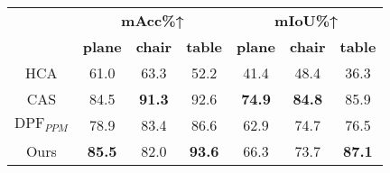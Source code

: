 \newcommand{\graycell}{\cellcolor[HTML]{EFEFEF}}
\newcommand{\redcell}{\cellcolor[HTML]{FAD1D0}}

\begin{tabular}{c|ccc|ccc}
\toprule
\multirow{2}{*}{} & \multicolumn{3}{c}{\textbf{mAcc\%↑}}         & \multicolumn{3}{c}{\textbf{mIoU\%↑}}    \\
                                 & \textbf{plane}  & \textbf{chair} & \textbf{table}     & \textbf{plane}  & \textbf{chair} & \textbf{table}\\
\midrule

HCA               & 61.0  & 63.3 & 52.2  & 41.4  & 48.4 & 36.3  \\
CAS               & 84.5  & \textbf{91.3} & 92.6  & \textbf{74.9}  & \textbf{84.8} & 85.9  \\
$\text{DPF}_{PPM}$& 78.9  & 83.4    & 86.6  & 62.9   & 74.7    & 76.5     \\

Ours \graycell    & \textbf{85.5} \graycell & 82.0 \graycell & \textbf{93.6} \graycell & 66.3  \graycell & 73.7 \graycell & \textbf{87.1} \graycell \\
\bottomrule
\end{tabular}
